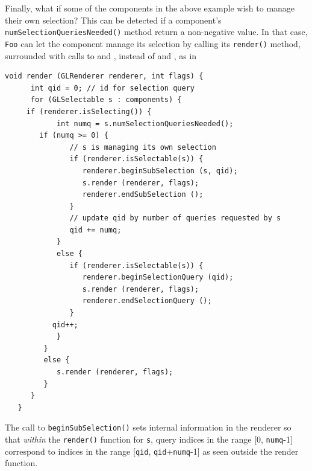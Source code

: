 \documentclass{article}
\begin{document}
Finally, what if some of the components in the above example wish to
manage their own selection? This can be detected if a component's {\tt
numSelectionQueriesNeeded()} method return a non-negative value.  In
that case, {\tt Foo} can let the component manage its selection by
calling its {\tt render()} method, surrounded with calls to
 and
, instead of
 and 
, as in
\begin{lstlisting}[]
   void render (GLRenderer renderer, int flags) {
      int qid = 0; // id for selection query
      for (GLSelectable s : components) {
	 if (renderer.isSelecting()) {
            int numq = s.numSelectionQueriesNeeded();
   	    if (numq >= 0) {
               // s is managing its own selection
               if (renderer.isSelectable(s)) {
                  renderer.beginSubSelection (s, qid);
                  s.render (renderer, flags);
                  renderer.endSubSelection ();
               }
               // update qid by number of queries requested by s
               qid += numq;
            }
            else {
               if (renderer.isSelectable(s)) {
                  renderer.beginSelectionQuery (qid);
                  s.render (renderer, flags);
                  renderer.endSelectionQuery ();
               }
	       qid++;
            }
         }
         else {
            s.render (renderer, flags);
         }
      }
   }
\end{lstlisting}
The call to {\tt beginSubSelection()} sets internal information in the
renderer so that {\it within} the {\tt render()} function for {\tt s},
query indices in the range [0, {\tt numq}-1] correspond to indices in
the range [{\tt qid}, {\tt qid}+{\tt numq}-1] as seen outside
the render function.
\end{document}
